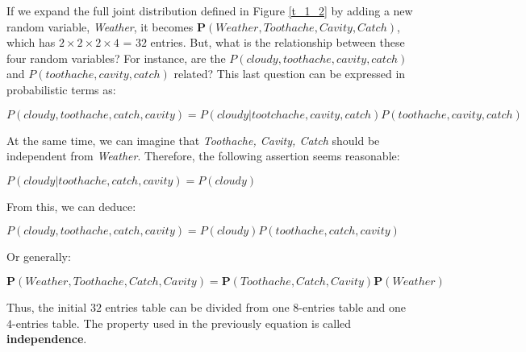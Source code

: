 If we expand the full joint distribution defined in Figure \ref{t_1_2} by adding a new random variable, \textit{Weather}, it becomes $\mathbf{P}(Weather, Toothache, Cavity, Catch)$, which has $2\times2\times2\times4$ = $32$ entries.
But, what is the relationship between these four random variables? For instance, are the $P(cloudy, toothache, cavity, catch)$ and $P(toothache, cavity, catch)$ related? This last question can be expressed in probabilistic terms as:
\begin{center}
    $P(cloudy, toothache, catch, cavity) = P(cloudy|tootchache, cavity, catch)P(toothache, cavity, catch)$
\end{center}
At the same time, we can imagine that \textit{Toothache, Cavity, Catch} should be independent from \textit{Weather}. Therefore, the following assertion seems reasonable:
\begin{center}
    $P(cloudy|toothache, catch, cavity) = P(cloudy)$
\end{center}
From this, we can deduce:
\begin{center}
    $P(cloudy, toothache, catch, cavity) = P(cloudy)P(toothache, catch, cavity)$
\end{center}
Or generally:
\begin{center}
    $\mathbf{P}(Weather, Toothache, Catch, Cavity) = \mathbf{P}(Toothache, Catch, Cavity)\mathbf{P}(Weather)$
\end{center}
Thus, the initial $32$ entries table can be divided from one $8$-entries table and one $4$-entries table. The property used in the previously equation is called \textbf{independence}.


